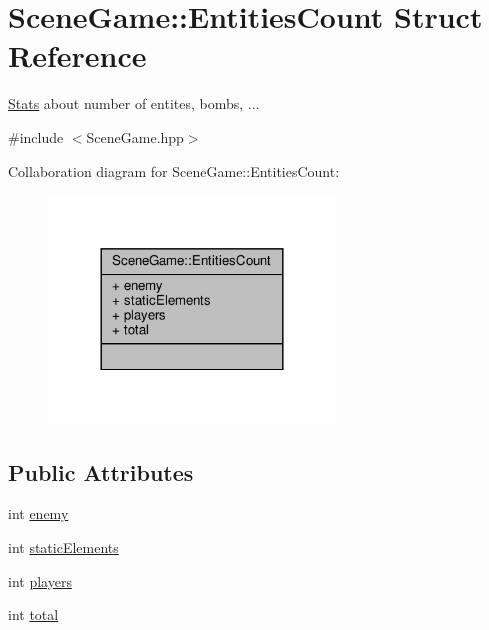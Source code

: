 \hypertarget{struct_scene_game_1_1_entities_count}{}\section{Scene\+Game\+:\+:Entities\+Count Struct Reference}
\label{struct_scene_game_1_1_entities_count}


\hyperlink{class_stats}{Stats} about number of entites, bombs, ...  




{\ttfamily \#include $<$Scene\+Game.\+hpp$>$}



Collaboration diagram for Scene\+Game\+:\+:Entities\+Count\+:
\nopagebreak
\begin{figure}[H]
\begin{center}
\leavevmode
\includegraphics[width=216pt]{struct_scene_game_1_1_entities_count__coll__graph}
\end{center}
\end{figure}
\subsection*{Public Attributes}
\begin{DoxyCompactItemize}
\item 
int \hyperlink{struct_scene_game_1_1_entities_count_a01d1a196529d79601774581595cae226}{enemy}
\item 
int \hyperlink{struct_scene_game_1_1_entities_count_a5b7a088d3b86e058e981716c62f6fcdd}{static\+Elements}
\item 
int \hyperlink{struct_scene_game_1_1_entities_count_a3835edefcaa19c792040655946719706}{players}
\item 
int \hyperlink{struct_scene_game_1_1_entities_count_a2b9fb8c1c4f3b6f6b8d850e8f68cdd77}{total}
\end{DoxyCompactItemize}


